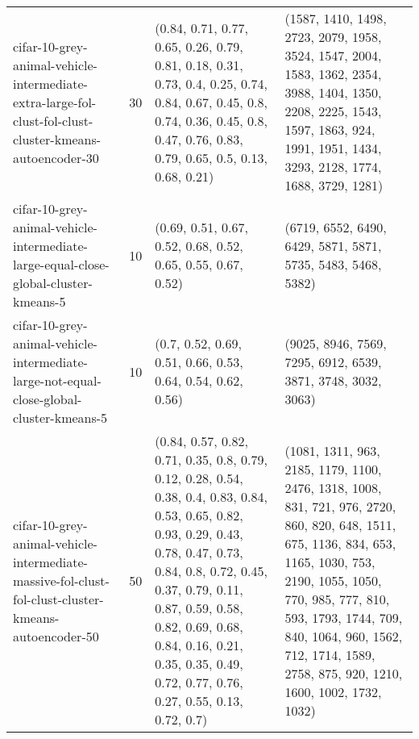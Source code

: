 \begin{longtable}{llll}
      cifar-10-grey-animal-vehicle-intermediate-extra-large-fol-clust-fol-clust-cluster-kmeans-autoencoder-30 &             30 &                                                                                                                          (0.84, 0.71, 0.77, 0.65, 0.26, 0.79, 0.81, 0.18, 0.31, 0.73, 0.4, 0.25, 0.74, 0.84, 0.67, 0.45, 0.8, 0.74, 0.36, 0.45, 0.8, 0.47, 0.76, 0.83, 0.79, 0.65, 0.5, 0.13, 0.68, 0.21) &                                                                                                                       (1587, 1410, 1498, 2723, 2079, 1958, 3524, 1547, 2004, 1583, 1362, 2354, 3988, 1404, 1350, 2208, 2225, 1543, 1597, 1863, 924, 1991, 1951, 1434, 3293, 2128, 1774, 1688, 3729, 1281) \\
                          cifar-10-grey-animal-vehicle-intermediate-large-equal-close-global-cluster-kmeans-5 &             10 &                                                                                                                                                                                                                                              (0.69, 0.51, 0.67, 0.52, 0.68, 0.52, 0.65, 0.55, 0.67, 0.52) &                                                                                                                                                                                                                                              (6719, 6552, 6490, 6429, 5871, 5871, 5735, 5483, 5468, 5382) \\
                      cifar-10-grey-animal-vehicle-intermediate-large-not-equal-close-global-cluster-kmeans-5 &             10 &                                                                                                                                                                                                                                               (0.7, 0.52, 0.69, 0.51, 0.66, 0.53, 0.64, 0.54, 0.62, 0.56) &                                                                                                                                                                                                                                              (9025, 8946, 7569, 7295, 6912, 6539, 3871, 3748, 3032, 3063) \\
          cifar-10-grey-animal-vehicle-intermediate-massive-fol-clust-fol-clust-cluster-kmeans-autoencoder-50 &             50 &  (0.84, 0.57, 0.82, 0.71, 0.35, 0.8, 0.79, 0.12, 0.28, 0.54, 0.38, 0.4, 0.83, 0.84, 0.53, 0.65, 0.82, 0.93, 0.29, 0.43, 0.78, 0.47, 0.73, 0.84, 0.8, 0.72, 0.45, 0.37, 0.79, 0.11, 0.87, 0.59, 0.58, 0.82, 0.69, 0.68, 0.84, 0.16, 0.21, 0.35, 0.35, 0.49, 0.72, 0.77, 0.76, 0.27, 0.55, 0.13, 0.72, 0.7) &                    (1081, 1311, 963, 2185, 1179, 1100, 2476, 1318, 1008, 831, 721, 976, 2720, 860, 820, 648, 1511, 675, 1136, 834, 653, 1165, 1030, 753, 2190, 1055, 1050, 770, 985, 777, 810, 593, 1793, 1744, 709, 840, 1064, 960, 1562, 712, 1714, 1589, 2758, 875, 920, 1210, 1600, 1002, 1732, 1032) \\

\end{longtable}
